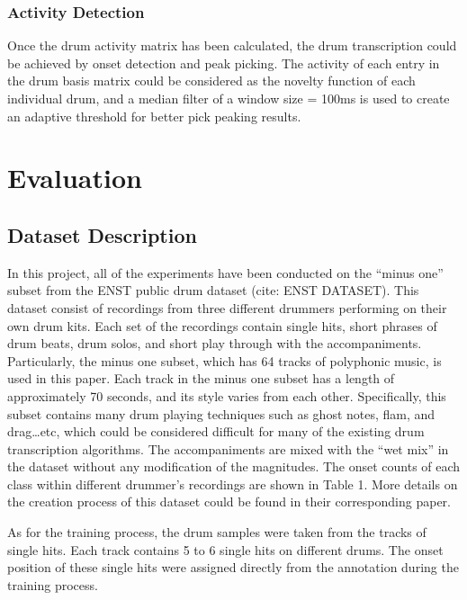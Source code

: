 \documentclass{article}
\begin{document}
\subsubsection{Activity Detection}\label{subsubsec:activity detection}
Once the drum activity matrix has been calculated, the drum transcription could be achieved by onset detection and peak picking. The activity of each entry in the drum basis matrix could be considered as the novelty function of each individual drum, and a median filter of a window size = 100ms is used to create an adaptive threshold for better pick peaking results. 

\section{Evaluation}\label{sec:Evaluation}
\subsection{Dataset Description}\label{subsec:dataset description}

In this project, all of the experiments have been conducted on the “minus one” subset from the ENST public drum dataset (cite: ENST DATASET). This dataset consist of recordings from three different drummers performing on their own drum kits. Each set of the recordings contain single hits, short phrases of drum beats, drum solos, and short play through with the accompaniments. Particularly, the minus one subset, which has 64 tracks of polyphonic music, is used in this paper. Each track in the minus one subset has a length of approximately 70 seconds, and its style varies from each other. Specifically, this subset contains many drum playing techniques such as ghost notes, flam, and drag…etc, which could be considered difficult for many of the existing drum transcription algorithms. The accompaniments are mixed with the “wet mix” in the dataset without any modification of the magnitudes. The onset counts of each class within different drummer’s recordings are shown in Table 1. More details on the creation process of this dataset could be found in their corresponding paper.  

As for the training process, the drum samples were taken from the tracks of single hits. Each track contains 5 to 6 single hits on different drums. The onset position of these single hits were assigned directly from the annotation during the training process.  
 
\end{document}
